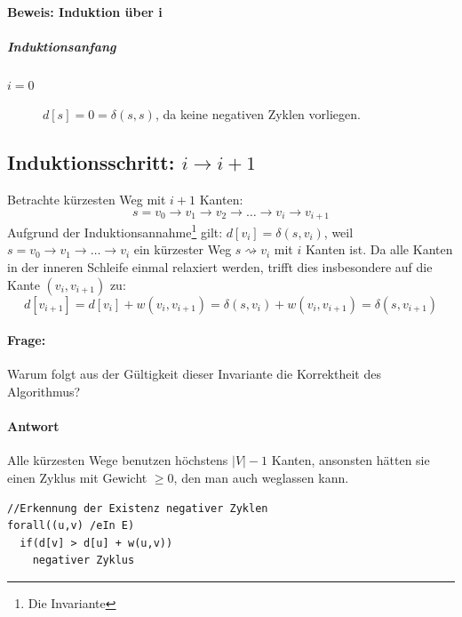 \paragraph{Beweis: Induktion über i}
\subparagraph{Induktionsanfang}
\begin{description}
	\item[$i=0$] $d[s] = 0 = \delta(s,s)$, da keine negativen Zyklen vorliegen.
\end{description}
\subsection{Induktionsschritt:  $i\rightarrow i+1$}
Betrachte kürzesten Weg mit $i+1$ Kanten:
\[ s=v_0\rightarrow v_1\rightarrow v_2\rightarrow\ldots\rightarrow v_i\rightarrow v_{i+1} \]
Aufgrund der Induktionsannahme\footnote{Die Invariante} gilt: $d[v_i] = \delta(s,v_i)$, weil $s=v_0\rightarrow v_1\rightarrow\ldots\rightarrow v_i$ ein kürzester Weg $s\rightsquigarrow v_i$ mit $i$ Kanten ist.
Da alle Kanten in der inneren Schleife einmal relaxiert werden, trifft dies insbesondere auf die Kante $(v_i, v_{i+1})$ zu:
\[ d[v_{i+1}] = d[v_i] + w(v_i, v_{i+1}) = \delta(s, v_i) + w(v_i, v_{i+1}) = \delta(s,v_{i+1}) \]
\paragraph{Frage:}
Warum folgt aus der Gültigkeit dieser Invariante die Korrektheit des Algorithmus?
\paragraph{Antwort}
Alle kürzesten Wege benutzen höchstens $|V|-1$ Kanten, ansonsten hätten sie einen Zyklus mit Gewicht $\geq 0$, den man auch weglassen kann.
\begin{lstlisting}[style = pseudo]
//Erkennung der Existenz negativer Zyklen
forall((u,v) /eIn E)
  if(d[v] > d[u] + w(u,v))
    negativer Zyklus
\end{lstlisting}